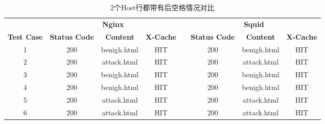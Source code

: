 \begin{table}
	\renewcommand\arraystretch{1.1}      %
	\caption{2个Host行都带有后空格情况对比}
	\vspace{1.2mm}                  %
	\centering                            %
	{\tabcolsep  0.05in                    %
		\begin{tabular}{cccccccc}
			\hline
			& \multicolumn{3}{c}{\textbf{Nginx}} & & \multicolumn{3}{c}{\textbf{Squid}}\\
			\cline{2-4}\cline{6-8}
			\textbf{Test Case}& \textbf{Status Code} & \textbf{Content}  & \textbf{X-Cache}  & &  \textbf{Status Code}  & \textbf{Content} & \textbf{X-Cache}\\
			\hline
			1 &   200  &  benigh.html  &  HIT  & &  200  &  benigh.html  &  HIT \\
			2 &  200 &  attack.html  &  HIT  & &  200  &  attack.html  &  HIT \\
			3 &  200  &  benigh.html &  HIT  & &  200  &  benigh.html  &  HIT \\
			4 &  200 &  benigh.html&  HIT      & &  200 & benigh.html   &  HIT \\
			5 &  200 &  attack.html  &  HIT  & &  200 &  attack.html  &  HIT \\
			6 &  200 &  attack.html  &  HIT     & &  200 & attack.html     &  HIT \\
			\hline
		\end{tabular}
	}
\end{table}

